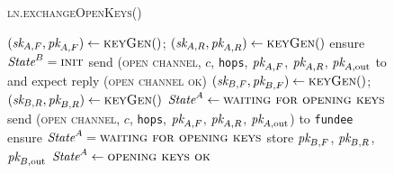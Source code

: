 \begin{figure}[H]
  \begin{processbox}{\textsc{ln.exchangeOpenKeys}()}
    \begin{algorithmic}[1]
      \State $(\textit{sk}_{A, F}, \textit{pk}_{A, F}) \gets \textsc{keyGen}()$;
      $(\textit{sk}_{A, R}, \textit{pk}_{A, R}) \gets \textsc{keyGen}()$
        \State ensure $\textit{State}^B = \textsc{init}$
        \State send (\textsc{open channel}, $c$, \texttt{hops}, $\textit{pk}_{A, F}$,
        $\textit{pk}_{A, R}$, $\textit{pk}_{A, \mathrm{out}}$ to \adversary and expect reply
        (\textsc{open channel ok})
        \State $(\textit{sk}_{B, F}, \textit{pk}_{B, F}) \gets \textsc{keyGen}()$; $(\textit{sk}_{B, R},
        \textit{pk}_{B, R}) \gets \textsc{keyGen}()$
      \Else \: 
        \State $\textit{State}^A \gets \textsc{waiting for opening keys}$
        \State send (\textsc{open channel}, $c$, \texttt{hops}, $\textit{pk}_{A, F}$,
        $\textit{pk}_{A, R}$, $\textit{pk}_{A, \mathrm{out}}$) to \texttt{fundee}
        \State {}
        \State {}
        \State {}
        \State {}
         
          \State {}
        \Else \: 
          \State {}
        \EndIf
        \State {}
        \State ensure $\textit{State}^A = \textsc{waiting for opening keys}$
        \State store $\textit{pk}_{B, F}$, $\textit{pk}_{B, R}$, $\textit{pk}_{B, \mathrm{out}}$
        \State $\textit{State}^A \gets \textsc{opening keys ok}$
      \EndIf
    \end{algorithmic}
  \end{processbox}
  \caption{}
  \label{code:ln:exchange-open-keys}
\end{figure}

